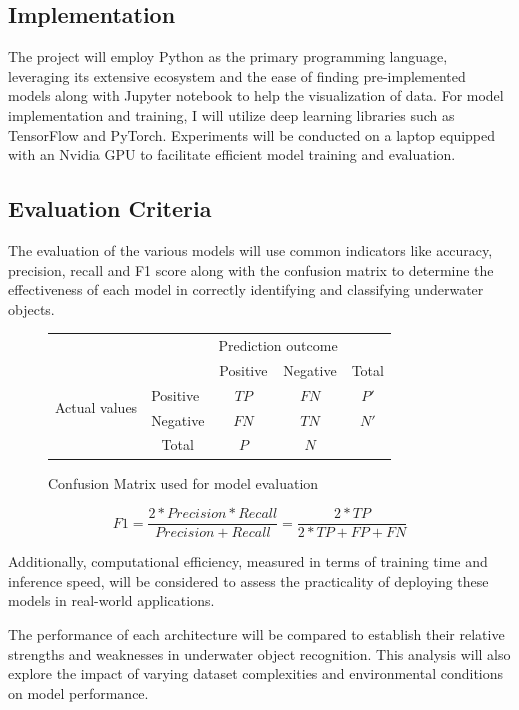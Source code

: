 \subsection{Implementation}

The project will employ Python as the primary programming language,
leveraging its extensive ecosystem and the ease of finding pre-implemented
models along with Jupyter notebook to help the visualization of data.
For model implementation and training, I will utilize deep learning
libraries such as TensorFlow and PyTorch.
Experiments will be conducted on a laptop equipped with an Nvidia GPU
to facilitate efficient model training and evaluation.

\subsection{Evaluation Criteria}

The evaluation of the various models will use common indicators like accuracy,
precision, recall and F1 score along with the confusion matrix
to determine the effectiveness of each model in correctly identifying and
classifying underwater objects.

\begin{figure}[ht]
    \begin{tabular}{l|l|c|c|c}
        \multicolumn{2}{c}{}&\multicolumn{2}{c}{Prediction outcome}&\\
        \cline{3-4}
        \multicolumn{2}{c|}{}&Positive&Negative&\multicolumn{1}{c}{Total}\\
        \cline{2-4}
        \multirow{2}{*}{Actual values}& Positive & $TP$ & $FN$ & $P'$\\
        \cline{2-4}
        & Negative & $FN$ & $TN$ & $N'$\\
        \cline{2-4}
        \multicolumn{1}{c}{} & \multicolumn{1}{c}{Total} & \multicolumn{1}{c}{$P$} & \multicolumn{    1}{c}{$N$} & \multicolumn{1}{c}{}\\
    \end{tabular}
    \caption{Confusion Matrix used for model evaluation}
    \label{Tab:confMatrix}
\end{figure}

\begin{equation}
    F1 = \frac{2*Precision*Recall}{Precision+Recall} = \frac{2*TP}{2*TP+FP+FN}
\end{equation}

Additionally, computational efficiency, measured in terms of training time
and inference speed, will be considered to assess the practicality
of deploying these models in real-world applications.

The performance of each architecture will be compared to establish
their relative strengths and weaknesses in underwater object recognition.
This analysis will also explore the impact of varying dataset complexities
and environmental conditions on model performance.

\FloatBarrier

